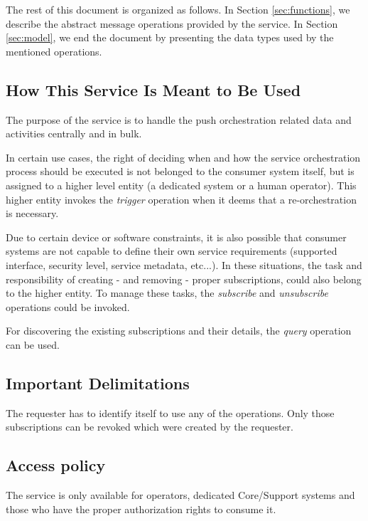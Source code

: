 \documentclass[a4paper]{arrowhead}
\begin{document}
The rest of this document is organized as follows.
In Section \ref{sec:functions}, we describe the abstract message operations provided by the service.
In Section \ref{sec:model}, we end the document by presenting the data types used by the mentioned operations.

\subsection{How This Service Is Meant to Be Used}

The purpose of the service is to handle the push orchestration related data and activities centrally and in bulk. 

In certain use cases, the right of deciding when and how the service orchestration process should be executed is not belonged to the consumer system itself, but is assigned to a higher level entity (a dedicated system or a human operator). This higher entity invokes the \textit{trigger} operation when it deems that a re-orchestration is necessary.

Due to certain device or software constraints, it is also possible that consumer systems are not capable to define their own service requirements (supported interface, security level, service metadata, etc...). In these situations, the task and responsibility of creating - and removing - proper subscriptions, could also belong to the higher entity. To manage these tasks, the \textit{subscribe} and \textit{unsubscribe} operations could be invoked.

For discovering the existing subscriptions and their details, the \textit{query} operation can be used.

\subsection{Important Delimitations}
\label{sec:delimitations}

The requester has to identify itself to use any of the operations. Only those subscriptions can be revoked which were created by the requester.

\subsection{Access policy}
\label{sec:accesspolicy}

The service is only available for operators, dedicated Core/Support systems and those who have the proper authorization rights to consume it.
\end{document}
